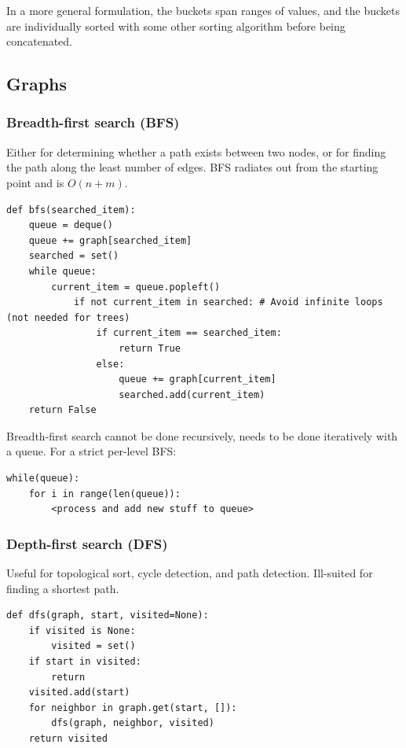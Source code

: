 \documentclass[table, xcdraw]{article}%
\begin{document}
In a more general formulation, the buckets span ranges of values, and the buckets are individually sorted with some other sorting algorithm before being concatenated.

\subsection{Graphs}

\subsubsection{Breadth-first search (BFS)}

Either for determining whether a path exists between two nodes, or for finding the path along the least number of edges. BFS radiates out from the starting point and is $O(n+m)$.

\begin{verbatim}
def bfs(searched_item):
    queue = deque()
    queue += graph[searched_item]
    searched = set()
    while queue:
        current_item = queue.popleft()
            if not current_item in searched: # Avoid infinite loops (not needed for trees)
                if current_item == searched_item:
                    return True
                else:
                    queue += graph[current_item]
                    searched.add(current_item)
    return False
\end{verbatim}

Breadth-first search cannot be done recursively, needs to be done iteratively with a queue. For a strict per-level BFS:

\begin{verbatim}
while(queue):
	for i in range(len(queue)):
		<process and add new stuff to queue>
\end{verbatim}

\subsubsection{Depth-first search (DFS)}

Useful for topological sort, cycle detection, and path detection. Ill-suited for finding a shortest path.

\begin{verbatim}
def dfs(graph, start, visited=None):
    if visited is None:
        visited = set()
    if start in visited:
        return
    visited.add(start)
    for neighbor in graph.get(start, []):
        dfs(graph, neighbor, visited)
    return visited
\end{verbatim}
\end{document}
